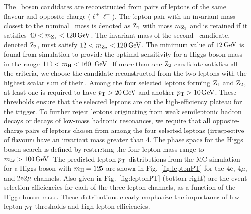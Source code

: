 \documentclass[12pt,twoside,a4paper,cmspaper,final,collab]{cms-tdr}
\begin{document}
The \cPZ\ boson candidates are reconstructed from pairs of leptons of the same
flavour and opposite charge ($\ell^+\ell^-$).
The lepton pair with an invariant mass closest to the nominal \cPZ\  mass is denoted
as $\mathrm{Z}_1$ with mass $m_{\mathrm{Z}_1}$ and is retained if it satisfies $40 < m_{\mathrm{Z}_1} < 120\,\text{Ge\hspace{-.08em}V}$.
The invariant mass of the second \cPZ\ candidate, denoted $\mathrm{Z}_2$,
must satisfy
$12 < m_{\mathrm{Z}_2} < 120\,\text{Ge\hspace{-.08em}V}$.
The minimum value of $12\,\text{Ge\hspace{-.08em}V}$ is found from simulation to provide  the optimal sensitivity for a Higgs boson mass
in the range $ 110 < m_{\mathrm{H}} < 160~\,\text{Ge\hspace{-.08em}V}$.
If more than one ${\mathrm{Z}_2}$ candidate satisfies all the criteria, we choose
the candidate reconstructed from the
two leptons with the highest scalar sum of their \PT.
Among the four selected leptons forming $\mathrm{Z}_1$ and $\mathrm{Z}_2$,
at least one is required to have $p_{\mathrm{T}} > 20\,\text{Ge\hspace{-.08em}V}$ and another
$p_{\mathrm{T}} > 10\,\text{Ge\hspace{-.08em}V}$.
These \PT thresholds ensure that the selected leptons
are on the high-efficiency plateau for the trigger.
To further reject leptons originating from weak semileptonic hadron decays
or decays of low-mass hadronic resonances, we require that all
opposite-charge pairs of leptons chosen from among the four selected leptons (irrespective of flavour)
have an invariant mass greater than  4\GeV.
The phase space for the Higgs boson search is defined by restricting the four-lepton
mass range to $m_{4\ell} > 100\,\text{Ge\hspace{-.08em}V}$.
The predicted lepton $p_{\mathrm{T}}$ distributions from the  MC simulation for a Higgs boson with  $m_{\mathrm{H}} = 125$\GeV
are shown in Fig.~\ref{fig:leptonPT} for the $4\mathrm{e}$, $4\mu$, and $2\mathrm{e} 2\mu$ channels.
Also given in Fig.~\ref{fig:leptonPT}  (bottom right) are the event selection efficiencies   for each
of the three lepton channels, as a function of the Higgs boson mass.
These distributions clearly emphasize the importance of low lepton-$p_{\mathrm{T}}$ thresholds and high
lepton efficiencies.
\end{document}
